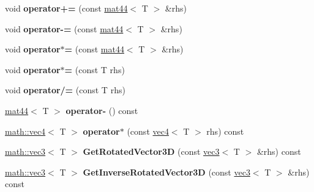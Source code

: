 \begin{DoxyCompactItemize}
\item 
\hypertarget{classmath_1_1mat44_a64eccf8dfc1eecebfe2e5c47ce7fb11d}{
void {\bfseries operator+=} (const \hyperlink{classmath_1_1mat44}{mat44}$<$ T $>$ \&rhs)}
\label{classmath_1_1mat44_a64eccf8dfc1eecebfe2e5c47ce7fb11d}

\item 
\hypertarget{classmath_1_1mat44_a423005059114cf33f951ab6f6fc9f034}{
void {\bfseries operator-\/=} (const \hyperlink{classmath_1_1mat44}{mat44}$<$ T $>$ \&rhs)}
\label{classmath_1_1mat44_a423005059114cf33f951ab6f6fc9f034}

\item 
\hypertarget{classmath_1_1mat44_a4b19d824403e0a5e0f711ee743bb7687}{
void {\bfseries operator$\ast$=} (const \hyperlink{classmath_1_1mat44}{mat44}$<$ T $>$ \&rhs)}
\label{classmath_1_1mat44_a4b19d824403e0a5e0f711ee743bb7687}

\item 
\hypertarget{classmath_1_1mat44_a94e0057189c9ab80a4210e86b37d2450}{
void {\bfseries operator$\ast$=} (const T rhs)}
\label{classmath_1_1mat44_a94e0057189c9ab80a4210e86b37d2450}

\item 
\hypertarget{classmath_1_1mat44_ad77cac714b0e06705bf46a61527edf4e}{
void {\bfseries operator/=} (const T rhs)}
\label{classmath_1_1mat44_ad77cac714b0e06705bf46a61527edf4e}

\item 
\hypertarget{classmath_1_1mat44_ad35246c0bf38cdc6cc9767031586d95d}{
\hyperlink{classmath_1_1mat44}{mat44}$<$ T $>$ {\bfseries operator-\/} () const }
\label{classmath_1_1mat44_ad35246c0bf38cdc6cc9767031586d95d}

\item 
\hypertarget{classmath_1_1mat44_a6adefbdab306368c53e157174cb61248}{
\hyperlink{classmath_1_1vec4}{math::vec4}$<$ T $>$ {\bfseries operator$\ast$} (const \hyperlink{classmath_1_1vec4}{vec4}$<$ T $>$ rhs) const }
\label{classmath_1_1mat44_a6adefbdab306368c53e157174cb61248}

\item 
\hypertarget{classmath_1_1mat44_a533e8195b855ca849794fd0f07a6ef78}{
\hyperlink{classmath_1_1vec3}{math::vec3}$<$ T $>$ {\bfseries GetRotatedVector3D} (const \hyperlink{classmath_1_1vec3}{vec3}$<$ T $>$ \&rhs) const }
\label{classmath_1_1mat44_a533e8195b855ca849794fd0f07a6ef78}

\item 
\hypertarget{classmath_1_1mat44_a278377764b33cc33ab5e08d8b24a4821}{
\hyperlink{classmath_1_1vec3}{math::vec3}$<$ T $>$ {\bfseries GetInverseRotatedVector3D} (const \hyperlink{classmath_1_1vec3}{vec3}$<$ T $>$ \&rhs) const }
\label{classmath_1_1mat44_a278377764b33cc33ab5e08d8b24a4821}


\end{DoxyCompactItemize}
